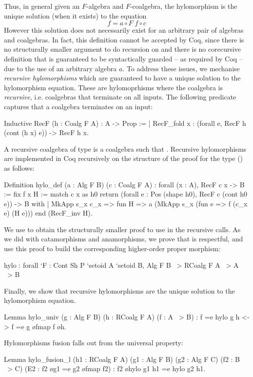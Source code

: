 \documentclass[ a4paper, UKenglish, cleveref, autoref, thm-restate]{lipics-v2021}
\begin{document}
Thus, in general given an $F$-algebra and $F$-coalgebra, the hylomorphism is the
unique solution (when it exists) to the equation
\begin{equation}
  \label{eq:hylo}
  f = a \circ F\; f \circ c
\end{equation}
However this solution does not necessarily exist for an arbitrary pair of
algebras and coalgebras. In fact, this definition cannot be accepted by Coq,
since there is no structurally smaller argument to do recursion on and there is
no corecursive definition that is guaranteed to be syntactically guarded -- as
required by Coq -- due to the use of an arbitrary algebra $a$.
To address these issues, we mechanise \emph{recursive
hylomorphisms} which are guaranteed to have a unique solution to the
hylomorphism equation. These are hylomoprhisms where the coalgebra is
\emph{recursive}, i.e. coalgebras that terminate on all inputs. The following
predicate captures that a coalgebra terminates on an input: 
\begin{coqcode}
Inductive RecF (h : Coalg F A) : A -> Prop :=
| RecF_fold x : (forall e, RecF h (cont (h x) e)) -> RecF h x.
\end{coqcode}
A recursive coalgebra of type  is a coalgebra 
 such that .
Recursive hylomorphisms are implemented in Coq recursively on the structure of
the proof for the type () as follows:
\begin{coqcode}
Definition hylo_def (a : Alg F B) (c : Coalg F A) 
  : forall (x : A), RecF c x -> B := fix f x H
  := match c x as h0 return (forall e : Pos (shape h0), RecF c (cont h0 e)) -> B
     with | MkApp s_x c_x => fun H => a (MkApp s_x (fun e => f (c_x e) (H e)))
     end (RecF_inv H).
\end{coqcode}
We use  to obtain the structurally smaller proof to use in
the recursive calls. As we did with catamorphisms and anamorphisms, we
prove that  is respectful, and use this proof to build the
corresponding higher-order proper morphism:
\begin{coqcode}
  hylo : forall `{F : Cont Sh P} `{setoid A} `{setoid B}, 
    Alg F B ~> RCoalg F A ~> A ~> B
\end{coqcode}
Finally, we show that recursive hylomorphisms are the unique solution to the
hylomorphism equation.
\begin{coqcode}
Lemma hylo_univ (g : Alg F B) (h : RCoalg F A) (f : A ~> B)
    : f =e hylo g h <-> f =e g \o fmap f \o h.
\end{coqcode}
Hylomorphisms fusion falls out from the universal property:
\begin{coqcode}
Lemma hylo_fusion_l (h1 : RCoalg F A) (g1 : Alg F B) (g2 : Alg F C)
  (f2 : B ~> C) (E2 : f2 \o g1 =e g2 \o fmap f2) : f2 \o hylo g1 h1 =e hylo g2 h1.
\end{coqcode}
\end{document}

